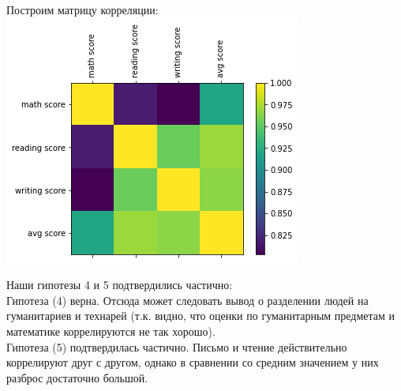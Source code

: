 \documentclass[12pt,a4paper]{article}
\begin{document}
Построим матрицу корреляции:\\
\includegraphics{corr}

Наши гипотезы 4 и 5 подтвердились частично:\\
Гипотеза (4) верна. Отсюда может следовать вывод о разделении людей на гуманитариев и технарей (т.к. видно, что оценки по гуманитарным предметам и математике коррелируются не так хорошо).\\
Гипотеза (5) подтвердилась частично. Письмо и чтение действительно коррелируют друг с другом, однако в сравнении со средним значением у них разброс достаточно большой.
\end{document}
